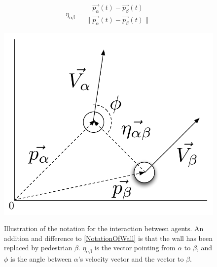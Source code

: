 \begin{equation}
    \eta_{\alpha \beta} =
        \frac{\vec{p_{\alpha}}(t) - \vec{p_{\beta}}(t)}
             {\|\vec{p_{\alpha}}(t) - \vec{p_{\beta}}(t) \|}
\end{equation}

\begin{figure}[ht]
    \centering
    {\includegraphics[scale=0.35]{Figures/NotationOfInteraction.pdf}} 
    \caption[Notation of the interaction between two agents]{Illustration of the notation for the interaction between agents.
	     An addition and difference to \ref{NotationOfWall} is that the wall has been replaced by pedestrian $\beta$.
	     $\eta_{\alpha \beta}$ is the vector pointing from $\alpha$ to $\beta$, and $\phi$ is the angle between $\alpha$'s 
	     velocity vector and the vector to $\beta$.}
    \label{fig:NotationOfInteraction}
\end{figure}



